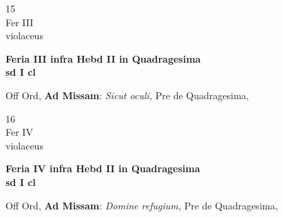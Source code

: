 \documentclass[10pt, openany]{book}
\begin{document}
        \begin{center}
            \begin{minipage}{3.5in}
                \vspace{2em}
                \begin{minipage}{0.5in}
                    {\Huge 15} \\
                    {\normalsize Fer III} \\
                    {\normalsize violaceus}
                \end{minipage}
                \begin{minipage}{3.0in}
                    \textbf{ \large Feria III infra Hebd II in Quadragesima \\
                    \textnormal{\normalsize sd I cl}} \\ 
                \end{minipage}
                \begin{justify}Off Ord, \textbf{Ad Missam}: \textit{Sicut oculi,} Pre de Quadragesima,   
                \end{justify}
            \end{minipage}
        \end{center}
    
        \begin{center}
            \begin{minipage}{3.5in}
                \vspace{2em}
                \begin{minipage}{0.5in}
                    {\Huge 16} \\
                    {\normalsize Fer IV} \\
                    {\normalsize violaceus}
                \end{minipage}
                \begin{minipage}{3.0in}
                    \textbf{ \large Feria IV infra Hebd II in Quadragesima \\
                    \textnormal{\normalsize sd I cl}} \\ 
                \end{minipage}
                \begin{justify}Off Ord, \textbf{Ad Missam}: \textit{Domine refugium,} Pre de Quadragesima,   
                \end{justify}
            \end{minipage}
        \end{center}
    
\end{document}
